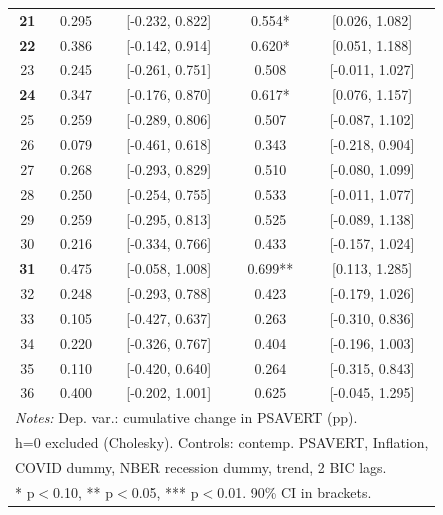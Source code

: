 \begin{table}[htbp]
\begin{tabular}{c cccc}
\textbf{21} & 0.295 & [-0.232, 0.822] & 0.554* & [0.026, 1.082] \\
\textbf{22} & 0.386 & [-0.142, 0.914] & 0.620* & [0.051, 1.188] \\
23 & 0.245 & [-0.261, 0.751] & 0.508 & [-0.011, 1.027] \\
\textbf{24} & 0.347 & [-0.176, 0.870] & 0.617* & [0.076, 1.157] \\
25 & 0.259 & [-0.289, 0.806] & 0.507 & [-0.087, 1.102] \\
26 & 0.079 & [-0.461, 0.618] & 0.343 & [-0.218, 0.904] \\
27 & 0.268 & [-0.293, 0.829] & 0.510 & [-0.080, 1.099] \\
28 & 0.250 & [-0.254, 0.755] & 0.533 & [-0.011, 1.077] \\
29 & 0.259 & [-0.295, 0.813] & 0.525 & [-0.089, 1.138] \\
30 & 0.216 & [-0.334, 0.766] & 0.433 & [-0.157, 1.024] \\
\textbf{31} & 0.475 & [-0.058, 1.008] & 0.699** & [0.113, 1.285] \\
32 & 0.248 & [-0.293, 0.788] & 0.423 & [-0.179, 1.026] \\
33 & 0.105 & [-0.427, 0.637] & 0.263 & [-0.310, 0.836] \\
34 & 0.220 & [-0.326, 0.767] & 0.404 & [-0.196, 1.003] \\
35 & 0.110 & [-0.420, 0.640] & 0.264 & [-0.315, 0.843] \\
36 & 0.400 & [-0.202, 1.001] & 0.625 & [-0.045, 1.295] \\
\midrule
\multicolumn{5}{l}{\textit{Notes:} Dep. var.: cumulative change in PSAVERT (pp).} \\
\multicolumn{5}{l}{h=0 excluded (Cholesky). Controls: contemp. PSAVERT, Inflation,} \\
\multicolumn{5}{l}{COVID dummy, NBER recession dummy, trend, 2 BIC lags.} \\
\multicolumn{5}{l}{* p$<$0.10, ** p$<$0.05, *** p$<$0.01. 90\% CI in brackets.} \\
\bottomrule
\end{tabular}
\end{table}
